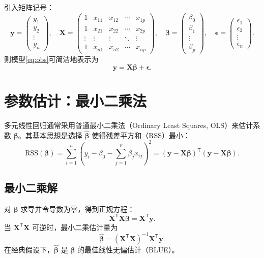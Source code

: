 \documentclass[UTF8]{ctexart}
\numberwithin{equation}{section}
\begin{document}
引入矩阵记号：
\[
\mathbf{y} = \begin{pmatrix} y_1 \\ y_2 \\ \vdots \\ y_n \end{pmatrix},\quad
\mathbf{X} = \begin{pmatrix}
1 & x_{11} & x_{12} & \cdots & x_{1p} \\
1 & x_{21} & x_{22} & \cdots & x_{2p} \\
\vdots & \vdots & \vdots & \ddots & \vdots \\
1 & x_{n1} & x_{n2} & \cdots & x_{np}
\end{pmatrix},\quad
\boldsymbol{\beta} = \begin{pmatrix} \beta_0 \\ \beta_1 \\ \vdots \\ \beta_p \end{pmatrix},\quad
\boldsymbol{\epsilon} = \begin{pmatrix} \epsilon_1 \\ \epsilon_2 \\ \vdots \\ \epsilon_n \end{pmatrix}.
\]
则模型\eqref{eq:obs}可简洁地表示为
\begin{equation}
\mathbf{y} = \mathbf{X} \boldsymbol{\beta} + \boldsymbol{\epsilon}.
\label{eq:matrix}
\end{equation}

\section{参数估计：最小二乘法}

多元线性回归通常采用普通最小二乘法（Ordinary Least Squares, OLS）来估计系数 \(\boldsymbol{\beta}\)。其基本思想是选择 \(\hat{\boldsymbol{\beta}}\) 使得残差平方和（RSS）最小：
\begin{equation}
\mathrm{RSS}(\boldsymbol{\beta}) = \sum_{i=1}^n \left(y_i - \beta_0 - \sum_{j=1}^p \beta_j x_{ij}\right)^2 = (\mathbf{y} - \mathbf{X}\boldsymbol{\beta})^\mathsf{T}(\mathbf{y} - \mathbf{X}\boldsymbol{\beta}).
\label{eq:rss}
\end{equation}

\subsection{最小二乘解}

对 \(\boldsymbol{\beta}\) 求导并令导数为零，得到正规方程：
\[
\mathbf{X}^\mathsf{T}\mathbf{X} \boldsymbol{\beta} = \mathbf{X}^\mathsf{T} \mathbf{y}.
\]
当 \(\mathbf{X}^\mathsf{T}\mathbf{X}\) 可逆时，最小二乘估计量为
\begin{equation}
\hat{\boldsymbol{\beta}} = (\mathbf{X}^\mathsf{T}\mathbf{X})^{-1} \mathbf{X}^\mathsf{T} \mathbf{y}.
\label{eq:ols}
\end{equation}
在经典假设下，\(\hat{\boldsymbol{\beta}}\) 是 \(\boldsymbol{\beta}\) 的最佳线性无偏估计（BLUE）。
\end{document}
